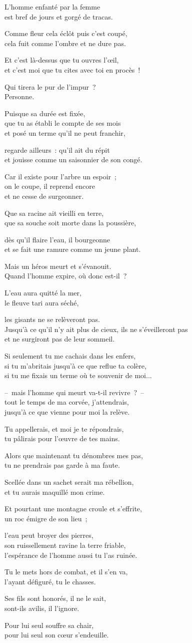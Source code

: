 \documentclass[twoside]{book} %
\newcommand{\lnatt}[1]{\reversemarginpar\marginpar[\sffamily\scriptsize #1]{}}
\newcommand{\lpar}[1]{\noindent\hangindent=2\parindent  #1\par} %
\newcommand\chapterclose{} %
\renewcommand{\lnatt}[1]{\marginpar{\sffamily\scriptsize #1}}
\begin{document}
\lpar{L’homme enfanté par la femme \\
est bref de jours et gorgé de tracas.}
\lpar{Comme fleur cela éclôt puis c’est coupé, \\
cela fuit comme l’ombre et ne dure pas.}
\lpar{Et c’est là-dessus que tu ouvres l’œil, \\
et c’est moi que tu cites avec toi en procès !}
\lpar{Qui tirera le pur de l’impur ? \\
Personne.}
\lpar{\lnatt{5}Puisque sa durée est fixée, \\
que tu as établi le compte de ses mois \\
et posé un terme qu’il ne peut franchir,}
\lpar{regarde ailleurs : qu’il ait du répit \\
et jouisse comme un saisonnier de son congé.}
\bigskip
\lpar{Car il existe pour l’arbre un espoir ; \\
on le coupe, il reprend encore \\
et ne cesse de surgeonner.}
\lpar{Que sa racine ait vieilli en terre, \\
que sa souche soit morte dans la poussière,}
\lpar{dès qu’il flaire l’eau, il bourgeonne \\
et se fait une ramure comme un jeune plant.}
\lpar{\lnatt{10}Mais un héros meurt et s’évanouit. \\
Quand l’homme expire, où donc est-il ?}
\lpar{L’eau aura quitté la mer, \\
le fleuve tari aura séché,}
\lpar{les gisants ne se relèveront pas. \\
Jusqu’à ce qu’il n’y ait plus de cieux, ils ne s’éveilleront pas \\
et ne surgiront pas de leur sommeil.}
\lpar{Si seulement tu me cachais dans les enfers, \\
si tu m’abritais jusqu’à ce que reflue ta colère, \\
si tu me fixais un terme où te souvenir de moi...}
\lpar{– mais l’homme qui meurt va-t-il revivre ? – \\
tout le temps de ma corvée, j’attendrais, \\
jusqu’à ce que vienne pour moi la relève.}
\lpar{\lnatt{15}Tu appellerais, et moi je te répondrais, \\
tu pâlirais pour l’œuvre de tes mains.}
\lpar{Alors que maintenant tu dénombres mes pas, \\
tu ne prendrais pas garde à ma faute.}
\lpar{Scellée dans un sachet serait ma rébellion, \\
et tu aurais maquillé mon crime.}
\lpar{Et pourtant une montagne croule et s’effrite, \\
un roc émigre de son lieu ;}
\lpar{l’eau peut broyer des pierres, \\
son ruissellement ravine la terre friable, \\
l’espérance de l’homme aussi tu l’as ruinée.}
\lpar{\lnatt{20}Tu le mets hors de combat, et il s’en va, \\
l’ayant défiguré, tu le chasses.}
\lpar{Ses fils sont honorés, il ne le sait, \\
sont-ils avilis, il l’ignore.}
\lpar{Pour lui seul souffre sa chair, \\
pour lui seul son cœur s’endeuille.}
\chapterclose
\end{document}
